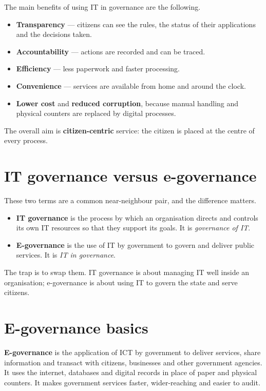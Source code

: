 \documentclass[11pt]{article}
\begin{document}
The main benefits of using IT in governance are the following.

\begin{itemize}
  \item \textbf{Transparency} --- citizens can see the rules, the status of
    their applications and the decisions taken.
  \item \textbf{Accountability} --- actions are recorded and can be traced.
  \item \textbf{Efficiency} --- less paperwork and faster processing.
  \item \textbf{Convenience} --- services are available from home and around
    the clock.
  \item \textbf{Lower cost} and \textbf{reduced corruption}, because manual
    handling and physical counters are replaced by digital processes.
\end{itemize}

The overall aim is \textbf{citizen-centric} service: the citizen is placed at
the centre of every process.

\section{IT governance versus e-governance}
These two terms are a common near-neighbour pair, and the difference matters.

\begin{itemize}
  \item \textbf{IT governance} is the process by which an organisation
    directs and controls its own IT resources so that they support its goals.
    It is \emph{governance of IT}.
  \item \textbf{E-governance} is the use of IT by government to govern and
    deliver public services. It is \emph{IT in governance}.
\end{itemize}

The trap is to swap them. IT governance is about managing IT well inside an
organisation; e-governance is about using IT to govern the state and serve
citizens.

\section{E-governance basics}
\textbf{E-governance} is the application of ICT by government to deliver
services, share information and transact with citizens, businesses and other
government agencies. It uses the internet, databases and digital records in
place of paper and physical counters. It makes government services faster,
wider-reaching and easier to audit.
\end{document}

